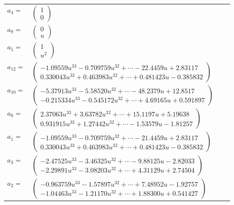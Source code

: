\documentclass[1p]{elsarticle_modified}
\theoremstyle{definition}
\begin{document}
\begin{tabular}{m{7pt} m{180pt} m{7pt} m{180pt} }
\flushright $a_{4}=$&$\begin{pmatrix}1\\0\end{pmatrix}$ \\
\flushright $a_{9}=$&$\begin{pmatrix}0\\u\end{pmatrix}$ \\
\flushright $a_{5}=$&$\begin{pmatrix}1\\u^2\end{pmatrix}$ \\
\flushright $a_{12}=$&$\begin{pmatrix}-1.09559 u^{33}-0.709759 u^{32}+\cdots-22.4459 u+2.83117\\0.330043 u^{33}+0.463983 u^{32}+\cdots+0.481423 u-0.385832\end{pmatrix}$ \\
\flushright $a_{10}=$&$\begin{pmatrix}-5.37913 u^{33}-5.58520 u^{32}+\cdots-48.2379 u+12.8517\\-0.215334 u^{33}-0.545172 u^{32}+\cdots+4.69165 u+0.591897\end{pmatrix}$ \\
\flushright $a_{6}=$&$\begin{pmatrix}2.37063 u^{33}+3.63782 u^{32}+\cdots+15.1197 u+5.19638\\0.931915 u^{33}+1.27442 u^{32}+\cdots-1.53579 u-1.81257\end{pmatrix}$ \\
\flushright $a_{1}=$&$\begin{pmatrix}-1.09559 u^{33}-0.709759 u^{32}+\cdots-21.4459 u+2.83117\\0.330043 u^{33}+0.463983 u^{32}+\cdots+0.481423 u-0.385832\end{pmatrix}$ \\
\flushright $a_{3}=$&$\begin{pmatrix}-2.47525 u^{33}-3.46325 u^{32}+\cdots-9.88125 u-2.82033\\-2.29891 u^{33}-3.08203 u^{32}+\cdots+4.31129 u+2.74504\end{pmatrix}$ \\
\flushright $a_{2}=$&$\begin{pmatrix}-0.963759 u^{33}-1.57897 u^{32}+\cdots+7.48952 u-1.92757\\-1.04463 u^{33}-1.21170 u^{32}+\cdots+1.88300 u+0.541427\end{pmatrix}$ \\

\end{tabular}
\end{document}

